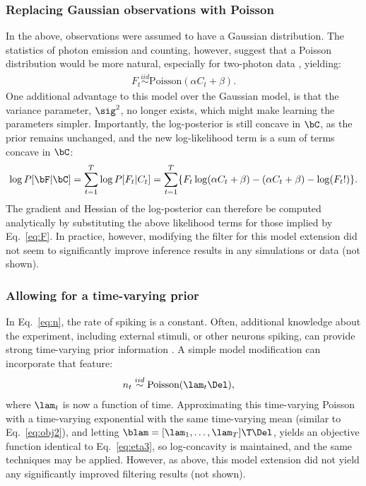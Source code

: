 \subsubsection{Replacing Gaussian observations with Poisson}

In the above, observations were assumed to have a Gaussian distribution.  The statistics of photon emission and counting, however, suggest that a Poisson distribution would be more natural, especially for two-photon data \cite{SjulsonMiesenbock07}, yielding:
\begin{align} \label{eq:poiss}
	F_t \overset{iid}{\sim}\text{Poisson}(\alpha C_t + \beta).
\end{align}
One additional advantage to this model over the Gaussian model, is that the variance parameter, $\sig^2$, no longer exists, which might make learning the parameters simpler.  Importantly, the log-posterior is still concave in $\bC$, as
the prior remains unchanged, and the new log-likelihood term is a sum of terms concave in $\bC$:
\begin{align}
	\log P[\bF | \bC] = \sum_{t=1}^T \log P[F_t | C_t ] = \sum_{t=1}^T \{F_t \log (\alpha C_t + \beta) -(\alpha C_t + \beta) - \log(F_t !)\}.
\end{align}
The gradient and Hessian of the log-posterior can therefore be computed analytically by substituting the above likelihood terms for those implied by Eq.~\eqref{eq:F}.  In practice, however, modifying the filter for this model extension did not seem to significantly improve inference results in any simulations or data (not shown).

\subsubsection{Allowing for a time-varying prior}

In Eq.~\eqref{eq:n}, the rate of spiking is a constant.  Often, additional knowledge about the experiment, including external stimuli, or other neurons spiking, can provide strong time-varying prior information \cite{VogelsteinPaninski09}.  A simple model modification can incorporate that feature:
\begin{align}
	n_t &\overset{iid}{\sim} \text{Poisson}(\lam_t \Del),
\end{align}
where $\lam_t$ is now a function of time.  Approximating this time-varying Poisson with a time-varying exponential with the same time-varying mean (similar to Eq.~\eqref{eq:obj2}), and letting $\blam = [\lam_1, \ldots, \lam_T]\T \Del$, yields an objective function identical to Eq.~\eqref{eq:eta3}, so log-concavity is maintained, and the same techniques may be applied.  However, as above, this model extension did not yield any significantly improved filtering results (not shown).

